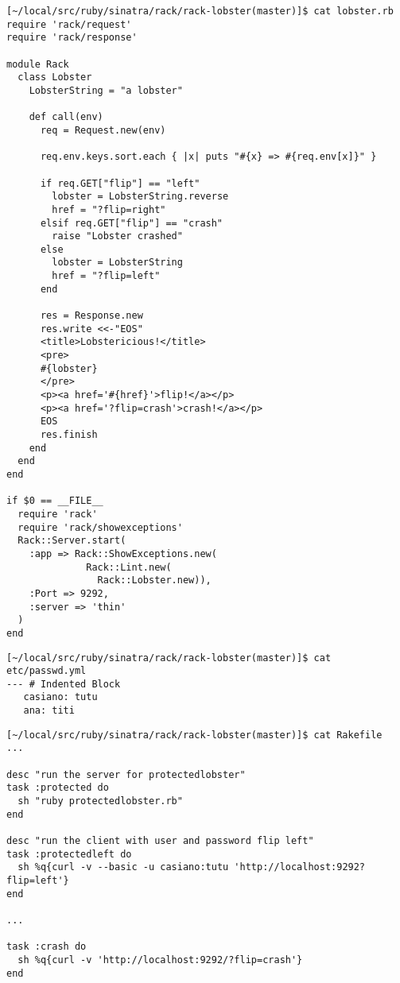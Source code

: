 \begin{verbatim}
[~/local/src/ruby/sinatra/rack/rack-lobster(master)]$ cat lobster.rb 
require 'rack/request'
require 'rack/response'

module Rack
  class Lobster
    LobsterString = "a lobster"

    def call(env)
      req = Request.new(env)

      req.env.keys.sort.each { |x| puts "#{x} => #{req.env[x]}" }

      if req.GET["flip"] == "left"
        lobster = LobsterString.reverse
        href = "?flip=right"
      elsif req.GET["flip"] == "crash"
        raise "Lobster crashed"
      else
        lobster = LobsterString
        href = "?flip=left"
      end

      res = Response.new
      res.write <<-"EOS"
      <title>Lobstericious!</title>
      <pre>
      #{lobster}
      </pre>
      <p><a href='#{href}'>flip!</a></p>
      <p><a href='?flip=crash'>crash!</a></p>
      EOS
      res.finish
    end
  end
end

if $0 == __FILE__
  require 'rack'
  require 'rack/showexceptions'
  Rack::Server.start(
    :app => Rack::ShowExceptions.new(
              Rack::Lint.new(
                Rack::Lobster.new)), 
    :Port => 9292,
    :server => 'thin'
  )
end
\end{verbatim}


\begin{verbatim}
[~/local/src/ruby/sinatra/rack/rack-lobster(master)]$ cat etc/passwd.yml 
--- # Indented Block
   casiano: tutu
   ana: titi
\end{verbatim}


\begin{verbatim}
[~/local/src/ruby/sinatra/rack/rack-lobster(master)]$ cat Rakefile
...

desc "run the server for protectedlobster"
task :protected do
  sh "ruby protectedlobster.rb"
end

desc "run the client with user and password flip left"
task :protectedleft do
  sh %q{curl -v --basic -u casiano:tutu 'http://localhost:9292?flip=left'}
end

...

task :crash do
  sh %q{curl -v 'http://localhost:9292/?flip=crash'}
end
\end{verbatim}


